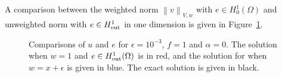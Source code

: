 \documentclass[final,leqno]{siamltex}
\newcommand{\nor}[1]{\left\| #1 \right\|}
\begin{document}
A comparison between the weighted norm $\nor{v}_{V,w}$ with $e\in H^1_0(\Omega)$ and unweighted norm with $e\in H^1_{\rm out}$ in one dimension is given in Figure~\ref{fig:robustComparison1D}.  
\begin{figure}[!h]
\centering
{}
\caption{Comparisons of $u$ and $e$ for $\epsilon = 10^{-3}$, $f=1$ and $\alpha = 0$. The solution when $w = 1$ and $e\in H^1_{\rm out}(\Omega)$ is in red, and the solution for when $w = x+\epsilon$ is given in blue.  The exact solution is given in black.}
\label{fig:robustComparison1D}
\end{figure}
\end{document}

